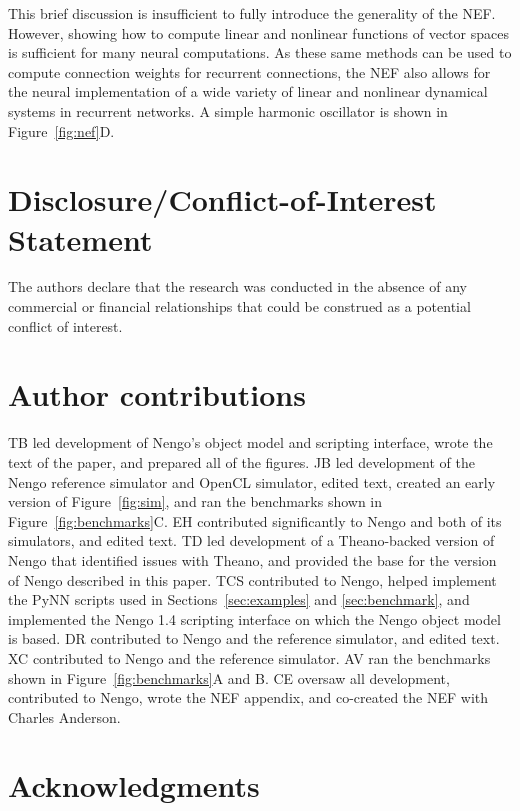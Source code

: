 \documentclass{frontiersSCNS}
\begin{document}
This brief discussion is insufficient
to fully introduce the generality of the NEF.
However, showing how to compute linear
and nonlinear functions of vector spaces
is sufficient for many neural computations.
As these same methods can be used
to compute connection weights for recurrent connections,
the NEF also allows for the neural implementation
of a wide variety of linear and nonlinear
dynamical systems in recurrent networks.
A simple harmonic oscillator is shown in Figure~\ref{fig:nef}D.

\section*{Disclosure/Conflict-of-Interest Statement}

The authors declare that the research was conducted in the absence of
any commercial or financial relationships that could be construed as a
potential conflict of interest.

\section*{Author contributions}

TB led development of
Nengo's object model and scripting interface,
wrote the text of the paper,
and prepared all of the figures.
JB led development of
the Nengo reference simulator and OpenCL simulator,
edited text, created an early version
of Figure~\ref{fig:sim},
and ran the benchmarks shown in
Figure~\ref{fig:benchmarks}C.
EH contributed significantly
to Nengo and both of its simulators, and edited text.
TD led development
of a Theano-backed
version of Nengo that
identified issues with Theano,
and provided the base for
the version of Nengo described in this paper.
TCS contributed
to Nengo, helped implement
the PyNN scripts used in
Sections~\ref{sec:examples} and \ref{sec:benchmark},
and implemented the Nengo 1.4 scripting interface
on which the Nengo object model is based.
DR contributed
to Nengo and the reference simulator,
and edited text.
XC contributed to Nengo
and the reference simulator.
AV ran the benchmarks
shown in Figure~\ref{fig:benchmarks}A and B.
CE oversaw all development,
contributed to Nengo,
wrote the NEF appendix,
and co-created the NEF with Charles Anderson.

\section*{Acknowledgments}
\end{document}
